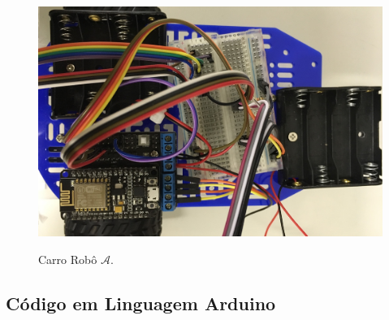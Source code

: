 		\begin{figure}[ht]
			\centering
			\includegraphics[width=1\linewidth]{img/robot.jpg}
			\label{fig:robot}
			\caption{Carro Robô $ \mathcal{A} $.}
		\end{figure}
		
	\subsection{Código em Linguagem Arduino}
